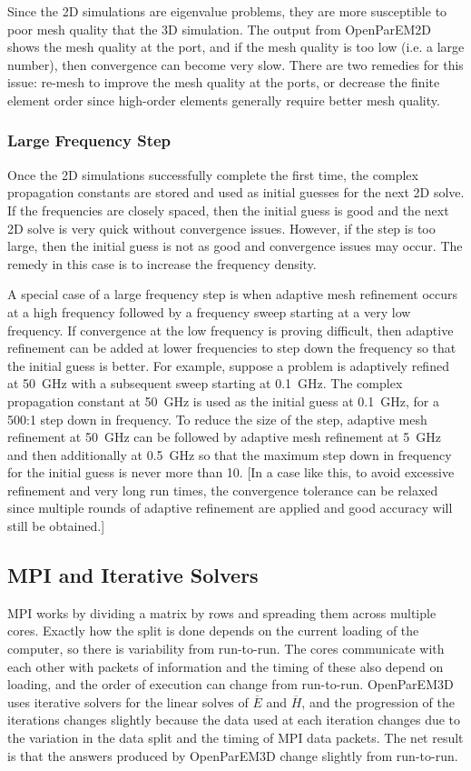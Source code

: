 \documentclass[titlepage]{article}
\renewcommand\_{\textunderscore\linebreak[1]}
\begin{document}
Since the 2D simulations are eigenvalue problems, they are more susceptible to poor mesh quality that the 3D simulation.  The output from OpenParEM2D shows the mesh quality at the port, and if the mesh quality is too low (i.e. a large number), then convergence can become very slow.  There are two remedies for this issue: re-mesh to improve the mesh quality at the ports, or decrease the finite element order since high-order elements generally require better mesh quality.

\subsubsection{Large Frequency Step}

Once the 2D simulations successfully complete the first time, the complex propagation constants are stored and used as initial guesses for the next 2D solve.  If the frequencies are closely spaced, then the initial guess is good and the next 2D solve is very quick without convergence issues.  However, if the step is too large, then the initial guess is not as good and convergence issues may occur.  The remedy in this case is to increase the frequency density.

A special case of a large frequency step is when adaptive mesh refinement occurs at a high frequency followed by a frequency sweep starting at a very low frequency.  If convergence at the low frequency is proving difficult, then adaptive refinement can be added at lower frequencies to step down the frequency so that the initial guess is better.  For example, suppose a problem is adaptively refined at 50~GHz with a subsequent sweep starting at 0.1~GHz.  The complex propagation constant at 50~GHz is used as the initial guess at 0.1~GHz, for a 500:1 step down in frequency.  To reduce the size of the step, adaptive mesh refinement at 50~GHz can be followed by adaptive mesh refinement at 5~GHz and then additionally at 0.5~GHz so that the maximum step down in frequency for the initial guess is never more than 10.  [In a case like this, to avoid excessive refinement and very long run times, the convergence tolerance can be relaxed since multiple rounds of adaptive refinement are applied and good accuracy will still be obtained.]

\subsection{MPI and Iterative Solvers}

MPI works by dividing a matrix by rows and spreading them across multiple cores.  Exactly how the split is done depends on the current loading of the computer, so there is variability from run-to-run.  The cores communicate with each other with packets of information and the timing of these also depend on loading, and the order of execution can change from run-to-run.  OpenParEM3D uses iterative solvers for the linear solves of $\overline{E}$ and $\overline{H}$, and the progression of the iterations changes slightly because the data used at each iteration changes due to the variation in the data split and the timing of MPI data packets.  The net result is that the answers produced by OpenParEM3D change slightly from run-to-run.
\end{document}
